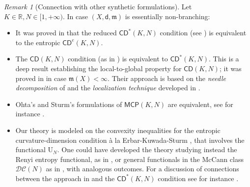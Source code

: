 \documentclass[11pt,a4paper]{article}
\theoremstyle{plain}
\theoremstyle{definition}
\theoremstyle{remark}
\newtheorem{remark}[theorem]{Remark}
\numberwithin{equation}{section}
\newcommand{\R}{\mathbb{R}} %
\newcommand{\CD}{\mathsf{CD}}
\newcommand{\MCP}{\mathsf{MCP}}
\newcommand{\U}{\mathrm{U}}
\newcommand{\mm}{\mathfrak m}
\newcommand{\sfd}{\mathsf d}
\begin{document}
\begin{remark}[Connection with other synthetic formulations]\label{rem:CDbetaVsLSV}
Let $K\in \R, N\in [1,+\infty)$. In case $(X,\sfd,\mm)$ is essentially non-branching:
\begin{itemize}
\item It was proved in \cite[Thm.\@ 3.12]{EKS} that the reduced $\CD^{*}(K,N)$ condition (see \cite{BS10}) is equivalent to the entropic $\CD^{e}(K,N)$. 
\item The $\CD(K,N)$ condition (as in \cite{sturm:II}) is equivalent to $\CD^{*}(K,N)$. This is a deep result establishing the local-to-global property for $\CD(K,N)$; it was proved in \cite{CavaMil} in case $\mm(X)<\infty$.
Their approach is based on the \emph{needle decomposition}  of \cite{Klartag} and the \emph{localization technique} developed in \cite{CavaMond}.

\item Ohta's \cite{OhtaMCP} and Sturm's \cite{sturm:II} formulations of $\MCP(K,N)$ are equivalent, see for instance \cite[App.\@ A]{CavaMondCCM}.
\item Our theory is modeled on the convexity inequalities for the entropic curvature-dimension condition à la Erbar-Kuwada-Sturm \cite{EKS}, that involves the functional $\U_N$. One could have developed the theory studying instead the Renyi entropy functional, as in \cite{sturm:II,BS10}, or general functionals in the McCann class  $\mathcal{DC}(N)$ as in \cite{lottvillani:metric,LVJFA}, with analogous outcomes. For a discussion of connections between the approach in  \cite{lottvillani:metric,LVJFA} and the $\CD^{*}(K,N)$ condition see for instance  \cite[Sec.\@ 9]{AMSmemo}.
\end{itemize}
\end{remark}
\end{document}
